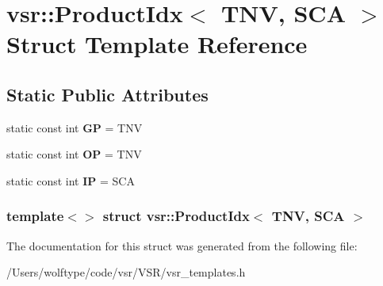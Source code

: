 \hypertarget{structvsr_1_1_product_idx_3_01_t_n_v_00_01_s_c_a_01_4}{\section{vsr\-:\-:Product\-Idx$<$ T\-N\-V, S\-C\-A $>$ Struct Template Reference}
\label{structvsr_1_1_product_idx_3_01_t_n_v_00_01_s_c_a_01_4}
}
\subsection*{Static Public Attributes}
\begin{DoxyCompactItemize}
\item 
\hypertarget{structvsr_1_1_product_idx_3_01_t_n_v_00_01_s_c_a_01_4_abc52bde62f0f44a95604d584ad850f89}{static const int {\bfseries G\-P} = T\-N\-V}\label{structvsr_1_1_product_idx_3_01_t_n_v_00_01_s_c_a_01_4_abc52bde62f0f44a95604d584ad850f89}

\item 
\hypertarget{structvsr_1_1_product_idx_3_01_t_n_v_00_01_s_c_a_01_4_aa8f0c18b867a0782f1282fb0edfb0f12}{static const int {\bfseries O\-P} = T\-N\-V}\label{structvsr_1_1_product_idx_3_01_t_n_v_00_01_s_c_a_01_4_aa8f0c18b867a0782f1282fb0edfb0f12}

\item 
\hypertarget{structvsr_1_1_product_idx_3_01_t_n_v_00_01_s_c_a_01_4_af9ed57414418b0d088ba3f3edc956b5c}{static const int {\bfseries I\-P} = S\-C\-A}\label{structvsr_1_1_product_idx_3_01_t_n_v_00_01_s_c_a_01_4_af9ed57414418b0d088ba3f3edc956b5c}

\end{DoxyCompactItemize}
\subsubsection*{template$<$$>$ struct vsr\-::\-Product\-Idx$<$ T\-N\-V, S\-C\-A $>$}



The documentation for this struct was generated from the following file\-:\begin{DoxyCompactItemize}
\item 
/\-Users/wolftype/code/vsr/\-V\-S\-R/vsr\-\_\-templates.\-h\end{DoxyCompactItemize}
